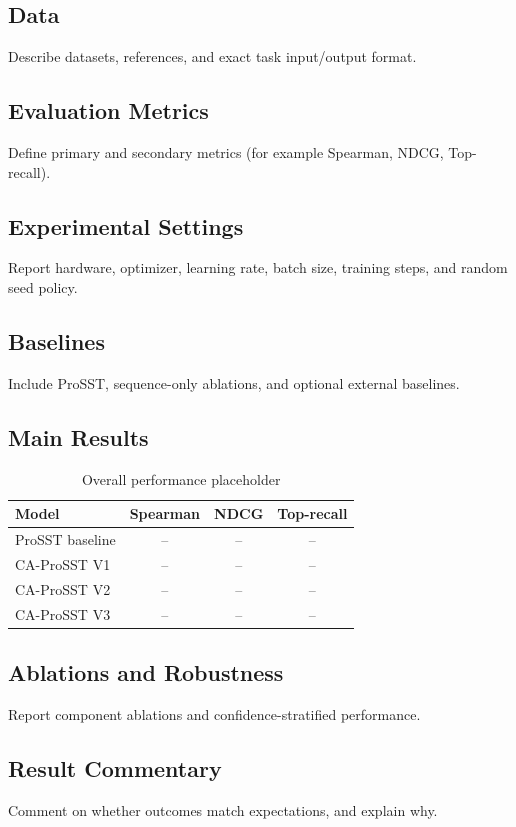 \documentclass[11pt,a4paper]{article}
\begin{document}
\subsection{Data}
Describe datasets, references, and exact task input/output format.

\subsection{Evaluation Metrics}
Define primary and secondary metrics (for example Spearman, NDCG, Top-recall).

\subsection{Experimental Settings}
Report hardware, optimizer, learning rate, batch size, training steps, and random seed policy.

\subsection{Baselines}
Include ProSST, sequence-only ablations, and optional external baselines.

\subsection{Main Results}
\begin{table}[h]
\centering
\caption{Overall performance placeholder}
\begin{tabular}{lccc}
\toprule
Model & Spearman & NDCG & Top-recall \\
\midrule
ProSST baseline & -- & -- & -- \\
CA-ProSST V1 & -- & -- & -- \\
CA-ProSST V2 & -- & -- & -- \\
CA-ProSST V3 & -- & -- & -- \\
\bottomrule
\end{tabular}
\end{table}

\subsection{Ablations and Robustness}
Report component ablations and confidence-stratified performance.

\subsection{Result Commentary}
Comment on whether outcomes match expectations, and explain why.
\end{document}
